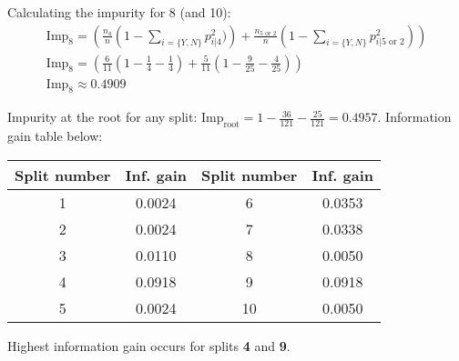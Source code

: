 \documentclass{article}
\begin{document}
\begin{flushleft}
Calculating the impurity for 8 (and 10):
\begin{gather*}
\text{Imp}_{8} = \left(\frac{n_{\text{4}}}{n} \left(1 - \sum_{i = \{Y, N\}} p_{i | \text{4}}^{2})\right) + \frac{n_{\text{5 or 2}}}{n} \left(1 - \sum_{i = \{Y, N\}} p_{i | \text{5 or 2}}^{2}\right)\right) \\
\text{Imp}_{8} = \left(\frac{6}{11} \left(1 - \frac{1}{4} - \frac{1}{4}\right) + \frac{5}{11} \left(1 - \frac{9}{25} - \frac{4}{25}\right)\right) \\
\text{Imp}_{8} \approx \mathbf{0.4909} 
\end{gather*}

Impurity at the root for any split:  \(\text{Imp}_{\text{root}} = \displaystyle 1 - \frac{36}{121} - \frac{25}{121} = \mathbf{0.4957}\).
Information gain table below:
\begin{center}
\begin{tabular}{|c|c|c|c|}
\hline
Split number & Inf. gain & Split number & Inf. gain \\
\hline
1 & 0.0024 & 6 & 0.0353 \\
\hline
2 & 0.0024 & 7 & 0.0338 \\
\hline
3 & 0.0110 & 8 & 0.0050 \\
\hline
4 & 0.0918 & 9 & 0.0918 \\
\hline
5 & 0.0024 & 10 & 0.0050 \\
\hline
\end{tabular}
\end{center}

Highest information gain occurs for splits \textbf{4} and \textbf{9}. 
\end{flushleft}
\end{document}
